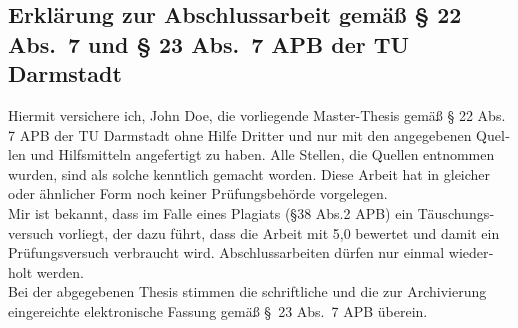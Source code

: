 \documentclass[11pt,longdoc,accentcolor=tud1b,paper=a4]{tuddesign/tudreport}
\title{\komTitle}
\newcommand{\komThesisType}{Master-Thesis\xspace}
\newcommand{\komName}{John Doe\xspace}
\begin{document}
	
	\frenchspacing
	\raggedbottom
	\maketitle
	
	
    
    \begin{otherlanguage}{ngerman}
    
    \chapter*{Erklärung zur Abschlussarbeit gemäß § 22 Abs.\ 7 und § 23 Abs.\ 7 APB der TU Darmstadt}	 
    
    Hiermit versichere ich, \komName, die vorliegende \komThesisType gemäß § 22 Abs. 7 APB der TU Darmstadt ohne Hilfe Dritter und nur mit den angegebenen Quellen und Hilfsmitteln angefertigt zu haben.
    Alle Stellen, die Quellen entnommen wurden, sind als solche kenntlich gemacht worden. 
    Diese Arbeit hat in gleicher oder ähnlicher Form noch keiner Prüfungsbehörde vorgelegen. \\
   
	\noindent Mir ist bekannt, dass im Falle eines Plagiats (§38 Abs.2 APB) ein Täuschungsversuch vorliegt, der dazu führt, dass die Arbeit mit 5,0 bewertet und damit ein Prüfungsversuch verbraucht wird. 
	Abschlussarbeiten dürfen nur einmal wiederholt werden.\\

	\noindent Bei der abgegebenen Thesis stimmen die schriftliche und die zur Archivierung eingereichte elektronische Fassung gemäß §~23 Abs.~7 APB überein. \\

\end{otherlanguage}
\end{document}

